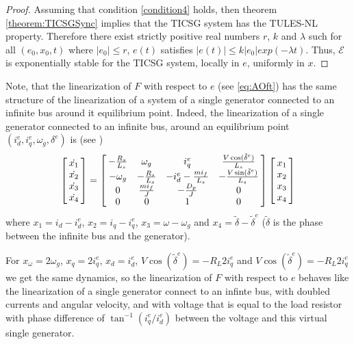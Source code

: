 \documentclass[letterpaper, 10 pt, conference]{ieeeconf}
\renewcommand{\l}    {{\lambda}}
\renewcommand{\o}    {{\omega}}
\newcommand{\nm}     {{\hbox{\hskip -3pt}}}
\newcommand{\Emscr}  {{\mathcal{E}}}
\begin{document}
\begin{proof}
Assuming that condition \ref{condition4} holds, then theorem
\ref{theorem:TICSGSync} implies that the TICSG system has the TULES-NL
property. Therefore there exist strictly positive real numbers $r$,
$k$ and $\l$ such for all $(e_0,x_0,t)$ where $\left| e_0 \right|
\leq r$, $e(t)$ satisfies $\left|e(t)\right|\leq k\left|e_0\right|
exp(-\l t)$. Thus, $\Emscr$ is exponentially stable for the TICSG 
system, locally in $e$, uniformly in $x$.
\end{proof}

Note, that the linearization of $F$ with respect to $e$ (see
\eqref{eq:AOft}) has the same structure of the linearization of a
system of a single generator connected to an infinite bus around it
equilibrium point. Indeed, the linearization of a single generator
connected to an infinite bus, around an equilibrium point
$(i^e_d,i^e_q,\o_g, \delta^e)$ is (see \cite[formula (3.4)]{NaWe:15})
$$ \left[\nm\begin{array}{c} \dot{x_1} \\ \dot{x_2 }\\ \dot{x_3} \\
   \dot{x_4} \end{array}\nm\right]=\left[\nm\begin{array}{cccc}
   -\frac{R_s}{L_s} & \omega_g & i_q^e & \frac{V\cos(\tilde
   {\delta}^e)}{L_s}\\ -\o_g & -\frac{R_s}{L_s} & -i_d^e-\frac{mi_f}
   {L_s} & -\frac{V\sin(\tilde{\delta}^e)}{L_s}\\ 0 & \frac{mi_{f}}
   {J} & -\frac{D_{p}}{J} & 0\\ 0 & 0 & 1 & 0 \end{array}\nm\right]  
   \left[\nm\begin{array}{c} x_1 \\ x_2 \\ x_3 \\ x_4
   \end{array}\nm\right]$$
where $x_1 = i_d-i^e_d$, $x_2 = i_q-i_q^e$, $x_3=\o-\o_g$ and
$x_4= \tilde{\delta} - \tilde{\delta}^e$ ($\tilde{\delta}$ is the
phase between the infinite bus and the generator).

For $x_\o=2\o_g$, $x_q=2 i_q^e$, $x_d=i_d^e$, $V\cos(\tilde{\delta}^e)
= -R_L 2 i_q^e$ and $V \cos(\tilde{\delta}^e) = -R_L 2 i_q^e$ we get
the same dynamics, so the linearization of $F$ with respect to $e$
behaves like the linearization of a single generator connect to an
infinte bus, with doubled currents and angular velocity, and with
voltage that is equal to the load resistor with phase difference of
$\tan^{-1}\left(i_q^e / i_d^e\right)$ between the voltage and this
virtual single generator.
\end{document}
